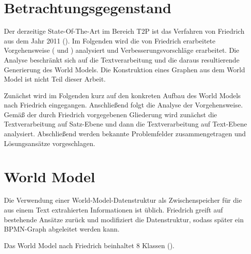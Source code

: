 \section{Betrachtungsgegenstand}
Der derzeitige State-Of-The-Art im Bereich \ac{T2P} ist das Verfahren von Friedrich aus dem Jahr 2011 (\cite[vgl.][11]{RIEFER}). Im Folgenden wird die von Friedrich erarbeitete Vorgehensweise (\cite[vgl.][]{FRIEDRICH1} und \cite[vgl.][]{FRIEDRICH2}) analysiert und Verbesserungsvorschläge erarbeitet. Die Analyse beschränkt sich auf die Textverarbeitung und die daraus resultierende Generierung des World Models. Die Konstruktion eines Graphen aus dem World Model ist nicht Teil dieser Arbeit.
\par
Zunächst wird im Folgenden kurz auf den konkreten Aufbau des World Models nach Friedrich eingegangen. Anschließend folgt die Analyse der Vorgehensweise. Gemäß der durch Friedrich vorgegebenen Gliederung wird zunächst die Textverarbeitung auf Satz-Ebene und dann die Textverarbeitung auf Text-Ebene analysiert. Abschließend werden bekannte Problemfelder zusammengetragen und Lösungsansätze vorgeschlagen.

\section{World Model}
Die Verwendung einer World-Model-Datenstruktur als Zwischenspeicher für die aus einem Text extrahierten Informationen ist üblich. Friedrich greift auf bestehende Ansätze zurück und modifiziert die Datenstruktur, sodass später ein \ac{BPMN}-Graph abgeleitet werden kann.
\par
Das World Model nach Friedrich beinhaltet 8 Klassen (\cite[vgl.][46]{FRIEDRICH2}). 

